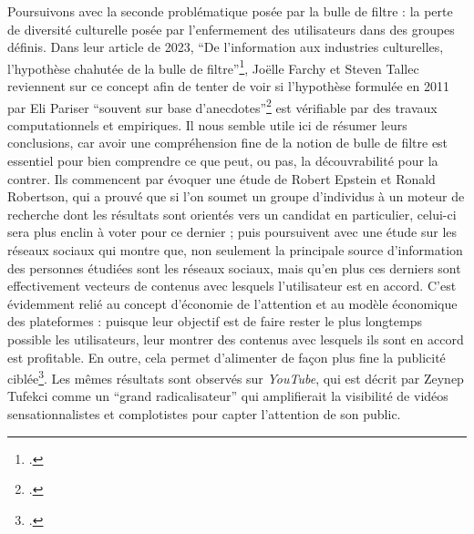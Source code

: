 Poursuivons avec la seconde problématique posée par la bulle de filtre : la perte de diversité culturelle posée par l'enfermement des utilisateurs dans des groupes définis. Dans leur article de 2023, \enquote{De l’information aux industries culturelles, l’hypothèse chahutée de la bulle de filtre}\footcite{farchy_linformation_2023}, Joëlle Farchy et Steven Tallec reviennent sur ce concept afin de tenter de voir si l’hypothèse formulée en 2011 par Eli Pariser \enquote{souvent sur base d’anecdotes}\footcite[§ 5]{farchy_linformation_2023} est vérifiable par des travaux computationnels et empiriques. Il nous semble utile ici de résumer leurs conclusions, car avoir une compréhension fine de la notion de bulle de filtre est essentiel pour bien comprendre ce que peut, ou pas, la découvrabilité pour la contrer. Ils commencent par évoquer une étude de Robert Epstein et Ronald Robertson, qui a prouvé que si l’on soumet un groupe d’individus à un moteur de recherche dont les résultats sont orientés vers un candidat en particulier, celui-ci sera plus enclin à voter pour ce dernier ; puis poursuivent avec une étude sur les réseaux sociaux qui montre que, non seulement la principale source d’information des personnes étudiées sont les réseaux sociaux, mais qu’en plus ces derniers sont effectivement vecteurs de contenus avec lesquels l’utilisateur est en accord. C’est évidemment relié au concept d’économie de l’attention et au modèle économique des plateformes : puisque leur objectif est de faire rester le plus longtemps possible les utilisateurs, leur montrer des contenus avec lesquels ils sont en accord est profitable. En outre, cela permet d’alimenter de façon plus fine la publicité ciblée\footcite{noauthor_bulles_nodate}. Les mêmes résultats sont observés sur \textit{YouTube}, qui est décrit par Zeynep Tufekci comme un \enquote{grand radicalisateur} qui amplifierait la visibilité de vidéos sensationnalistes et complotistes pour capter l’attention de son public.

